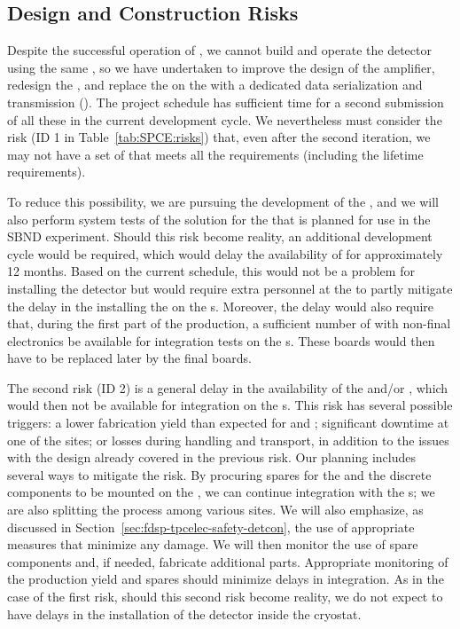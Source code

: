 \subsection{Design and Construction Risks}
\label{sec:fdsp-tpcelec-risks-design}

Despite the successful operation of , we cannot build and operate
the   detector using the same , so we have
undertaken to improve the design of the  amplifier, redesign
the , and replace the  on the  with a dedicated data
serialization and transmission  (). The project schedule has
sufficient time for a second submission of all these  in the current development cycle. We  nevertheless must consider the risk (ID 1
in Table~\ref{tab:SPCE:risks}) that, even after the second iteration, 
we may not have a set of  that meets all the  requirements
(including the lifetime requirements). 

To reduce this possibility, we are pursuing the development of the  , and we
will also perform system tests of the  solution for the  that is planned for use in the SBND experiment. Should this risk become reality, an
additional development cycle would be required, which would delay the availability
of  for approximately 12 months. Based on the current schedule, this would
not be a problem for installing the detector but would require extra 
personnel at the  to partly mitigate the delay in the
installing the  on the s. Moreover, the delay would also require
that, during the first part of the  production, a sufficient number
of  with non-final electronics be available for integration tests
on the s. These boards would then have to be replaced later
by the final boards.

The second risk (ID 2) is a general delay in the availability of the 
and/or , which would then not be available for integration
on the s. This risk has several possible triggers: a lower fabrication yield 
than expected for  and ;
significant downtime at one of the  sites; or losses during 
handling and transport, in addition to the issues with the design already 
covered in the previous risk. Our planning includes several ways to mitigate the risk. By
procuring spares for the  and the discrete components to be mounted on the
, we can continue integration with the s;
we are also splitting the  process among various sites. We will also emphasize,
as discussed in Section~\ref{sec:fdsp-tpcelec-safety-detcon}, the use of appropriate
measures that minimize any  damage. We will then monitor the use
of spare components and, if needed, fabricate additional parts. Appropriate
monitoring of the production yield and spares should minimize
delays in  integration. As in the case of the first risk, should this
second risk become reality, we do not expect to have delays in the installation of the 
detector inside the cryostat. 
 
